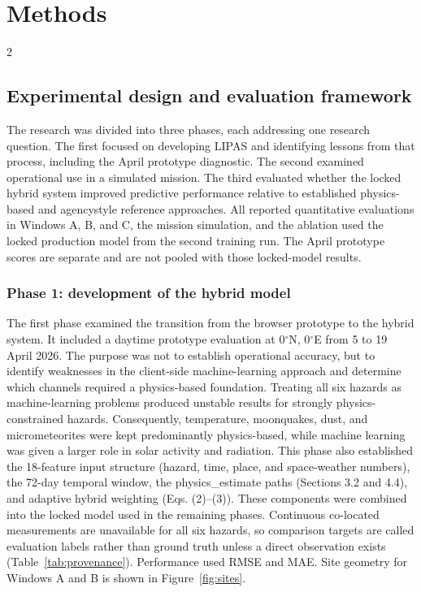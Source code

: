 \section{Methods}
\begin{multicols}{2}

\subsection{Experimental design and evaluation framework}

The research was divided into three phases, each addressing one research question. The first focused on developing LIPAS and identifying lessons from that process, including the April prototype diagnostic. The second examined operational use in a simulated mission. The third evaluated whether the locked hybrid system improved predictive performance relative to established physics-based and agencystyle reference approaches. All reported quantitative evaluations in Windows A, B, and C, the mission simulation, and the ablation used the locked production model from the second training run. The April prototype scores are separate and are not pooled with those locked-model results.

\subsubsection{Phase 1: development of the hybrid model}

The first phase examined the transition from the browser prototype to the hybrid system. It included a daytime prototype evaluation at 0$^\circ$N, 0$^\circ$E from 5 to 19 April 2026. The purpose was not to establish operational accuracy, but to identify weaknesses in the client-side machine-learning approach and determine which channels required a physics-based foundation. Treating all six hazards as machine-learning problems produced unstable results for strongly physics-constrained hazards. Consequently, temperature, moonquakes, dust, and micrometeorites were kept predominantly physics-based, while machine learning was given a larger role in solar activity and radiation. This phase also established the 18-feature input structure (hazard, time, place, and space-weather numbers), the 72-day temporal window, the physics\_estimate paths (Sections 3.2 and 4.4), and adaptive hybrid weighting (Eqs. (2)--(3)). These components were combined into the locked model used in the remaining phases. Continuous co-located measurements are unavailable for all six hazards, so comparison targets are called evaluation labels rather than ground truth unless a direct observation exists (Table~\ref{tab:provenance}). Performance used RMSE and MAE. Site geometry for Windows A and B is shown in Figure~\ref{fig:sites}.


\end{multicols}
